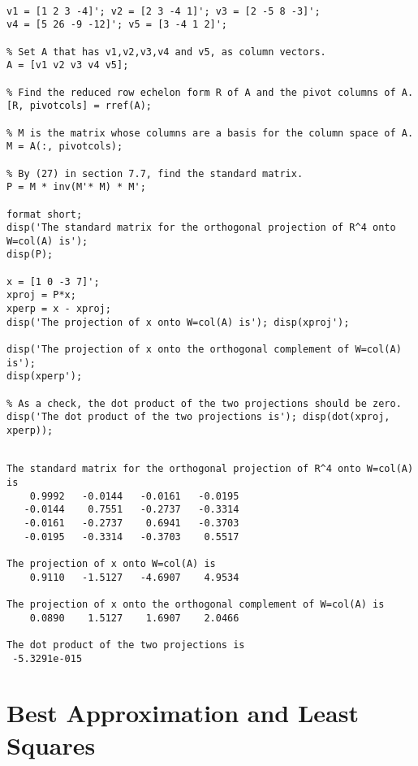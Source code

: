 \begin{sol}
\begin{verbatim}

v1 = [1 2 3 -4]'; v2 = [2 3 -4 1]'; v3 = [2 -5 8 -3]';
v4 = [5 26 -9 -12]'; v5 = [3 -4 1 2]';

% Set A that has v1,v2,v3,v4 and v5, as column vectors.
A = [v1 v2 v3 v4 v5]; 

% Find the reduced row echelon form R of A and the pivot columns of A.
[R, pivotcols] = rref(A);

% M is the matrix whose columns are a basis for the column space of A.
M = A(:, pivotcols);

% By (27) in section 7.7, find the standard matrix.
P = M * inv(M'* M) * M';

format short;
disp('The standard matrix for the orthogonal projection of R^4 onto W=col(A) is');
disp(P);

x = [1 0 -3 7]'; 
xproj = P*x; 
xperp = x - xproj;
disp('The projection of x onto W=col(A) is'); disp(xproj');

disp('The projection of x onto the orthogonal complement of W=col(A) is');
disp(xperp');

% As a check, the dot product of the two projections should be zero.
disp('The dot product of the two projections is'); disp(dot(xproj, xperp));
\end{verbatim}


\begin{outputs}
\begin{verbatim}

The standard matrix for the orthogonal projection of R^4 onto W=col(A) is
    0.9992   -0.0144   -0.0161   -0.0195
   -0.0144    0.7551   -0.2737   -0.3314
   -0.0161   -0.2737    0.6941   -0.3703
   -0.0195   -0.3314   -0.3703    0.5517

The projection of x onto W=col(A) is
    0.9110   -1.5127   -4.6907    4.9534

The projection of x onto the orthogonal complement of W=col(A) is
    0.0890    1.5127    1.6907    2.0466

The dot product of the two projections is
 -5.3291e-015
\end{verbatim}
\end{outputs}

\end{sol}

\section{Best Approximation and Least Squares}

